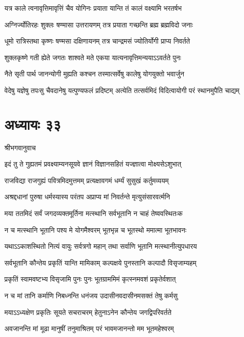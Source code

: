 \twolineshloka
{यत्र काले त्वनावृत्तिमावृत्तिं चैव योगिनः}
{प्रयाता यान्ति तं कालं वक्ष्यामि भरतर्षभ}


\twolineshloka
{अग्निर्ज्योतिरहः शुक्लः षण्मासा उत्तरायणम्}
{तत्र प्रयाता गच्छन्ति ब्रह्म ब्रह्मविदो जनाः}


\twolineshloka
{धूमो रात्रिस्तथा कृष्णः षण्मसा दक्षिणायनम्}
{तत्र चान्द्रमसं ज्योतिर्योगी प्राप्य निवर्तते}


\twolineshloka
{शुक्लकृष्णे गती ह्येते जगतः शाश्वते मते}
{एकया यात्यनावृत्तिमन्ययाऽऽवर्तते पुनः}


\twolineshloka
{नैते सृती पार्थ जानन्योगी मुह्यति कश्चन}
{तस्मात्सर्वेषु कालेषु योगयुक्तो भवार्जुन}


\twolineshloka
{वेदेषु यज्ञेषु तपःसु चैवदानेषु यत्पुण्यफलं प्रदिष्टम्}
{अत्येति तत्सर्वमिदं विदित्वायोगी परं स्थानमुपैति चाद्यम्}


\chapter{अध्यायः ३३}
\twolineshloka
{श्रीभगवानुवाच}
{}


\twolineshloka
{इदं तु ते गुह्यतमं प्रवक्ष्याम्यनसूयवे}
{ज्ञानं विज्ञानसहितं यज्ज्ञात्वा मोक्ष्यसेऽशुभात्}


\twolineshloka
{राजविद्या राजगुह्यं पवित्रमिदमुत्तमम्}
{प्रत्यक्षावगमं धर्म्यं सुसुखं कर्तुमव्ययम्}


\twolineshloka
{अश्रद्दधानां पुरुषा धर्मस्यास्य परंतप}
{अप्राप्य मां निवर्तन्ते मृत्युसंसारवर्त्मनि}


\twolineshloka
{मया ततमिदं सर्वं जगदव्यक्तमूर्तिना}
{मत्स्थानि सर्वभूतानि न चाहं तेष्ववस्थितःक}


\twolineshloka
{न च मत्स्थानि भूतानि पश्य मे योगमैश्वरम्}
{भूतभृन्न च भूतस्थो ममात्मा भूतभावनः}


\twolineshloka
{यथाऽऽकाशस्थितो नित्यं वायुः सर्वत्रगो महान्}
{तथा सर्वाणि भूतानि मत्स्थानीत्युपधारय}


\twolineshloka
{सर्वभूतानि कौन्तेय प्रकृतिं यान्ति मामिकाम्}
{कल्पक्षये पुनस्तानि कल्पादौ विसृजाम्यहम्}


\twolineshloka
{प्रकृतिं स्वामवष्टभ्य विसृजामि पुनः पुनः}
{भूतग्राममिमं कृत्स्नमवशं प्रकृतेर्वशात्}


\twolineshloka
{न च मां तानि कर्माणि निबध्नन्ति धनंजय}
{उदासीनवदासीनमसक्तं तेषु कर्मसु}


\twolineshloka
{मयाऽऽध्यक्षेण प्रकृतिः सूयते सचराचरम्}
{हेतुनाऽनेन कौन्तेय जगद्विपरिवर्तते}


\twolineshloka
{अवजानन्ति मां मूढा मानुषीं तनुमाश्रितम्}
{परं भावमजानन्तो मम भूतमहेश्वरम्}


